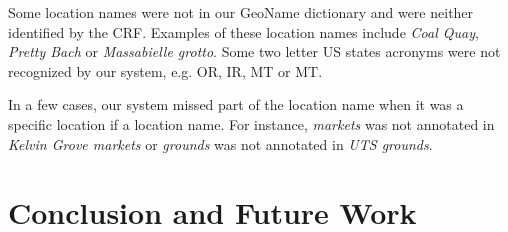 \documentclass[11pt]{article}
\begin{document}
Some location names were not in our GeoName dictionary and were neither identified by the CRF.
Examples of these location names include \textit{Coal Quay}, \textit{Pretty Bach} or \textit{Massabielle grotto}.
Some two letter US states acronyms were not recognized by our system, e.g. OR, IR, MT or MT.

In a few cases, our system missed part of the location name when it was a specific location if a location name.
For instance, \textit{markets} was not annotated in \textit{Kelvin Grove markets} or \textit{grounds} was not annotated in \textit{UTS grounds}.


\section{Conclusion and Future Work}
\label{sec:conclusion}




\end{document}
